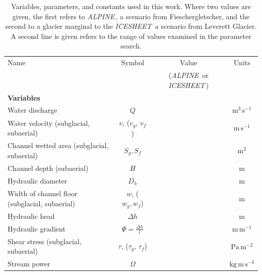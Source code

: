 \documentclass[esurf, manuscript]{copernicus}
\newcommand{\alpine}{\textit{ALPINE}\,}
\newcommand{\icesheet}{\textit{ICESHEET}\,}
\begin{document}
\begin{table}[hbt!]
  \centering
  \caption{Variables, parameters, and constants used in this work.
    Where two values are given, the first refers to  \alpine{}, a scenario from Fieschergletscher, and the second to a glacier marginal to the \icesheet{} a scenario from Leverett Glacier.
    A second line is given refers to the range of values examined in the parameter search.}
  \small 
  \begin{tabular}{ l  c  c c }
    Name &Symbol&  Value&Units \\
         && (\alpine{} or \icesheet{})\\
    \hline
    \textbf{Variables}  & & & \\
    Water discharge  & $Q$& & $\mathrm{m^{3}\,s^{-1}}$ \\
    Water velocity (subglacial, subaerial)  & $v$, ($v_g,\,v_{f}$)& & $\mathrm{m\,s^{-1}}$ \\
    Channel wetted area (subglacial, subaerial) &  $S_g, S_f$& & $\mathrm{m^2}$     \\
    Channel depth (subaerial) & $H$&& $\mathrm{m}$\\
    Hydraulic diameter &$D_h$&&$\mathrm{m}$\\
    Width of channel floor (subglacial, subaerial) & $w$, ($w_g,w_f$)&  & $\mathrm{m}$     \\
    Hydraulic head &$\Delta h$&& $\mathrm{m}$\\
    Hydraulic gradient &$\Psi=\frac{\Delta h}{l}$&& $\mathrm{m\, m^{-1}}$\\
    Shear stress (subglacial, subaerial) & $\tau$, ($\tau_g,\,\tau_f$) && $\mathrm{Pa \, m^{-2}}$ \\
    Stream power & $\Omega$ && $\mathrm{ kg \, m\, s^{-3}}$ \\



\end{tabular}
\end{table}
\end{document}
